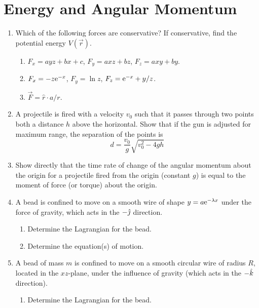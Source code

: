 \documentclass[../psets.tex]{subfiles}
\begin{document}
\section{Energy and Angular Momentum}
\begin{enumerate}
    \item {}Which of the following forces are conservative? If conservative, find the potential energy $V(\vec{r})$.
    \begin{enumerate}
        \item $F_x=ayz+bx+c$, $F_y=axz+bz$, $F_z=axy+by$.
        \item $F_x=-z\e[-x]$, $F_y=\ln z$, $F_z=\e[-x]+y/z$.
        \item $\vec{F}=\hat{r}\cdot a/r$.
    \end{enumerate}
    \item A projectile is fired with a velocity $v_0$ such that it passes through two points both a distance $h$ above the horizontal. Show that if the gun is adjusted for maximum range, the separation of the points is
    \begin{equation*}
        d = \frac{v_0}{g}\sqrt{v_0^2-4gh}
    \end{equation*}
    \item Show directly that the time rate of change of the angular momentum about the origin for a projectile fired from the origin (constant $g$) is equal to the moment of force (or torque) about the origin.
    \item A bead is confined to move on a smooth wire of shape $y=a\e[-\lambda x]$ under the force of gravity, which acts in the $-\jhat$ direction.
    \begin{enumerate}
        \item Determine the Lagrangian for the bead.
        \item Determine the equation(s) of motion.
    \end{enumerate}
    \item A bead of mass $m$ is confined to move on a smooth circular wire of radius $R$, located in the $xz$-plane, under the influence of gravity (which acts in the $-\khat$ direction).
    \begin{enumerate}
        \item Determine the Lagrangian for the bead.

\end{enumerate}
\end{enumerate}
\end{document}

